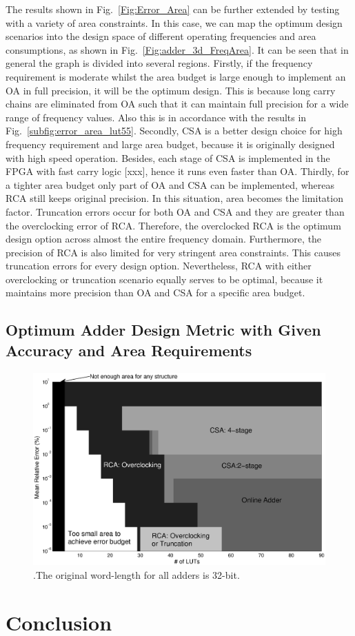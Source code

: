 \documentclass[10pt, conference, compsocconf]{IEEEtran}
\begin{document}
The results shown in Fig.~\ref{Fig:Error_Area} can be further extended by testing with a variety of area constraints. In this case, we can map the optimum design scenarios into the design space of different operating frequencies and area consumptions, as shown in Fig.~\ref{Fig:adder_3d_FreqArea}. It can be seen that in general the graph is divided into several regions. Firstly, if the frequency requirement is moderate whilst the area budget is large enough to implement an OA in full precision, it will be the optimum design. This is because long carry chains are eliminated from OA such that it can maintain full precision for a wide range of frequency values. Also this is in accordance with the results in Fig.~\ref{subfig:error_area_lut55}. Secondly, CSA is a better design choice for high frequency requirement and large area budget, because it is originally designed with high speed operation. Besides, each stage of CSA is implemented in the FPGA with fast carry logic [xxx], hence it runs even faster than OA. Thirdly, for a tighter area budget only part of OA and CSA can be implemented, whereas RCA still keeps original precision. In this situation, area becomes the limitation factor. Truncation errors occur for both OA and CSA and they are greater than the overclocking error of RCA. Therefore, the overclocked RCA is the optimum design option across almost the entire frequency domain. Furthermore, the precision of RCA is also limited for very stringent area constraints. This causes truncation errors for every design option. Nevertheless, RCA with either overclocking or truncation scenario equally serves to be optimal, because it maintains more precision than OA and CSA for a specific area budget.


\subsection{Optimum Adder Design Metric with Given Accuracy and Area Requirements}
%
\begin{figure}[tbp]
  \centering
  \includegraphics[width=.8\textwidth]{./figures/exp/3d_ErrorArea.eps}
  \caption{.The original word-length for all adders is 32-bit.}
  \label{Fig:adder_3d_ErrorArea}
\end{figure}

\section{Conclusion}\label{sec:conclusion}






\end{document}
